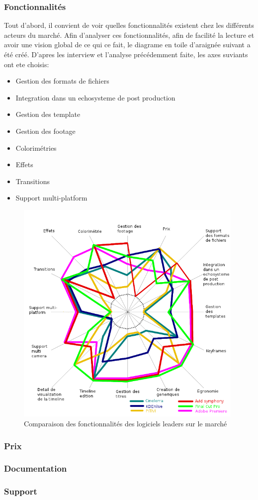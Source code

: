 \subsubsection{Fonctionnalités}
  Tout d'abord, il convient de voir quelles fonctionnalités existent chez les différents
  acteurs du marché. Afin d'analyser ces fonctionnalités, afin de facilité la lecture et
  avoir une vision global de ce qui ce fait, le diagrame en toile d'araignée suivant a été créé.
  D'apres les interview et l'analyse précédemment faite, les axes suviants ont ete choisis:
  \begin {itemize}
    \item{Gestion des formats de fichiers}
    \item{Integration dans un echosysteme de post production}
    \item{Gestion des template}
    \item{Gestion des footage}
    \item{Colorimétries}
    \item{Effets}
    \item{Transitions}
    \item{Support multi-platform}
  \end {itemize}
  \begin{figure}
      \begin{center}
        \includegraphics[width=0.98\textwidth]{images/spiderDiagramFeaturesComparision}
      \end{center}
      \caption{Comparaison des fonctionnalités des logiciels leaders sur le marché}
      \label{Yes}
  \end{figure}
  \newpage

  \subsubsection{Prix}
  \subsubsection{Documentation}
  \subsubsection{Support}
